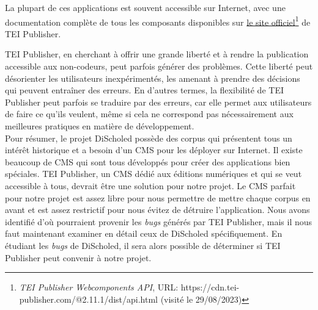 La plupart de ces applications est souvent accessible sur Internet, avec une documentation complète de tous les composants disponibles sur \href{https://cdn.tei-publisher.com/@2.11.1/dist/api.html}{le site officiel}\footnote{\textit{TEI Publisher Webcomponents API}, URL: https://cdn.tei-publisher.com/@2.11.1/dist/api.html (visité le 29/08/2023)} de TEI Publisher.

TEI Publisher, en cherchant à offrir une grande liberté et à rendre la publication accessible aux non-codeurs, peut parfois générer des problèmes. Cette liberté peut désorienter les utilisateurs inexpérimentés, les amenant à prendre des décisions qui peuvent entraîner des erreurs. En d'autres termes, la flexibilité de TEI Publisher peut parfois se traduire par des erreurs, car elle permet aux utilisateurs de faire ce qu'ils veulent, même si cela ne correspond pas nécessairement aux meilleures pratiques en matière de développement.\\

Pour résumer, le projet DiScholed possède des corpus qui présentent tous un intérêt historique et a besoin d'un CMS pour les déployer sur Internet. Il existe beaucoup de CMS qui sont tous développés pour créer des applications bien spéciales. TEI Publisher, un CMS dédié aux éditions numériques et qui se veut accessible à tous, devrait être une solution pour notre projet. Le CMS parfait pour notre projet est assez libre pour nous permettre de mettre chaque corpus en avant et est assez restrictif pour nous évitez de détruire l'application. Nous avons identifié d'où pourraient provenir les \textit{bugs} générés par TEI Publisher, mais il nous faut maintenant examiner en détail ceux de DiScholed spécifiquement. En étudiant les \textit{bugs} de DiScholed, il sera alors possible de déterminer si TEI Publisher peut convenir à notre projet.